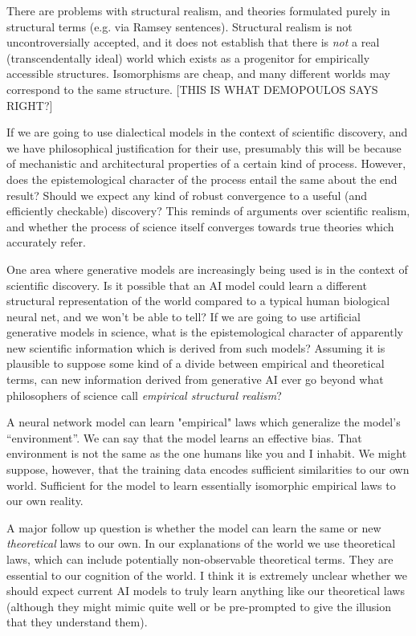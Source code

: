 \documentclass[11pt, oneside]{article}   	%
\begin{document}
There are problems with structural realism, and theories formulated purely in structural terms (e.g. via Ramsey sentences).  Structural realism is not uncontroversially accepted, and it does not establish that there is \emph{not} a real (transcendentally ideal) world which exists as a progenitor for empirically accessible structures.  Isomorphisms are cheap, and many different worlds may correspond to the same structure.  [THIS IS WHAT DEMOPOULOS SAYS RIGHT?]


If we are going to use dialectical models in the context of scientific discovery, and we have philosophical justification for their use, presumably this will be because of mechanistic and architectural properties of a certain kind of process.  However, does the epistemological character of the process entail the same about the end result?  Should we expect any kind of robust convergence to a useful (and efficiently checkable) discovery?  This reminds of arguments over scientific realism, and whether the process of science itself converges towards true theories which accurately refer.  






One area where generative models are increasingly being used is in the context of scientific discovery.  Is it possible that an AI model could learn a different structural representation of the world compared to a typical human biological neural net, and we won’t be able to tell?  If we are going to use artificial generative models in science, what is the epistemological character of apparently new scientific information which is derived from such models?  Assuming it is plausible to suppose some kind of a divide between empirical and theoretical terms, can new information derived from generative AI ever go beyond what philosophers of science call \emph{empirical structural realism}?

A neural network model can learn "empirical" laws which generalize the model's ``environment''.  We can say that the model learns an effective bias. That environment is not the same as the one humans like you and I inhabit.   We might suppose, however, that the training data encodes sufficient similarities to our own world.  Sufficient for the model to learn essentially isomorphic empirical laws to our own reality.

A major follow up question is whether the model can learn the same or new \emph{theoretical} laws to our own.  In our explanations of the world we use theoretical laws, which can include potentially non-observable theoretical terms.  They are essential to our cognition of the world.  I think it is extremely unclear whether we should expect current AI models to truly learn anything like our theoretical laws (although they might mimic quite well or be pre-prompted to give the illusion that they understand them).  
\end{document}
